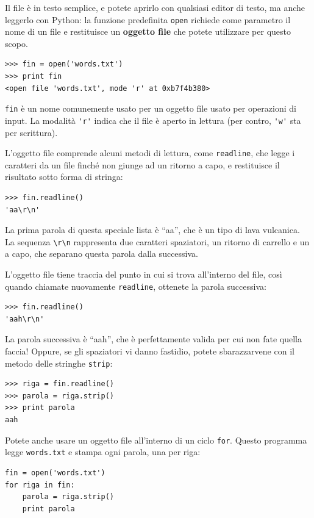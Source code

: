 \documentclass[10pt]{book}
\begin{document}
Il file è in testo semplice, e potete aprirlo con qualsiasi editor di testo, ma anche leggerlo con Python: la funzione predefinita {\tt open} richiede come parametro il nome di un file e restituisce un {\bf oggetto file} che potete utilizzare per questo scopo.

\begin{verbatim}
>>> fin = open('words.txt')
>>> print fin
<open file 'words.txt', mode 'r' at 0xb7f4b380>
\end{verbatim}
%
{\tt fin} è un nome comunemente usato per un oggetto file usato per operazioni di input. La modalità \verb"'r'" indica che il file è aperto in lettura (per contro, \verb"'w'" sta per scrittura).

L'oggetto file comprende alcuni metodi di lettura, come {\tt readline}, che legge i caratteri da un file finché non giunge ad un ritorno a capo, e restituisce il risultato sotto forma di stringa:

\begin{verbatim}
>>> fin.readline()
'aa\r\n'
\end{verbatim}
%
La prima parola di questa speciale lista è ``aa'', che è un tipo di lava vulcanica. La sequenza \verb"\r\n" rappresenta due caratteri spaziatori, un ritorno di carrello e un a capo, che separano questa parola dalla successiva.

L'oggetto file tiene traccia del punto in cui si trova all'interno del file, così quando chiamate nuovamente {\tt readline}, ottenete la parola successiva:

\begin{verbatim}
>>> fin.readline()
'aah\r\n'
\end{verbatim}
%
La parola successiva è ``aah'', che è perfettamente valida per cui non fate quella faccia! Oppure, se gli spaziatori vi danno fastidio, potete sbarazzarvene con il metodo delle stringhe {\tt strip}:

\begin{verbatim}
>>> riga = fin.readline()
>>> parola = riga.strip()
>>> print parola
aah
\end{verbatim}
%
Potete anche usare un oggetto file all'interno di un ciclo {\tt for}.
Questo programma legge {\tt words.txt} e stampa ogni parola, una per riga:

\begin{verbatim}
fin = open('words.txt')
for riga in fin:
    parola = riga.strip()
    print parola
\end{verbatim}
%
\end{document}

